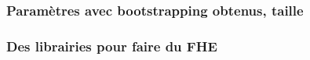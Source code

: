 \documentclass[15pt]{beamer}
\begin{document}

\begin{frame} 
\frametitle{Paramètres avec bootstrapping obtenus, taille}
\end{frame} 


\begin{frame} 
\frametitle{Des librairies pour faire du FHE}
\end{frame} 


% 	    

    

\end{document}
